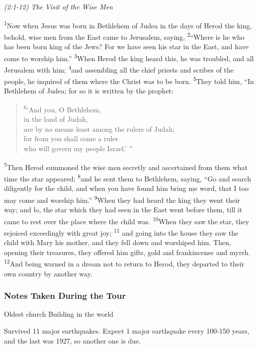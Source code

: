 \documentclass[letterpaper]{report}
\newcommand{\vs}[1]{\textsuperscript{#1}}
\begin{document}
{\centering
\emph{(2:1-12) The Visit of the Wise Men}\\
}
\begin{multicols}{2}
\vs{1}Now when Jesus was born in Bethlehem of Judea in the days of Herod the king,
behold, wise men from the East came to Jerusalem, saying,
\vs{2}``Where is he who has been born king of the Jews?
For we have seen his star in the East, and have come to worship him.''
\vs{3}When Herod the king heard this, he was troubled, and all Jerusalem with him;
\vs{4}and assembling all the chief priests and scribes of the people,
he inquired of them where the Christ was to be born.
\vs{5}They told him, ``In Bethlehem of Judea; for so it is written by the prophet:

\begin{verse}
\vs{6}`And you, O Bethlehem,\\
in the land of Judah,\\
are by no means least among the rulers of Judah;\\
for from you shall come a ruler\\
who will govern my people Israel.' ''\\ 
\end{verse}

\vs{7}Then Herod summoned the wise men secretly and ascertained from them what
time the star appeared;
\vs{8}and he sent them to Bethlehem, saying,
``Go and search diligently for the child,
and when you have found him bring me word,
that I too may come and worship him.''
\vs{9}When they had heard the king they went their way;
and lo, the star which they had seen in the East went before them,
till it came to rest over the place where the child was.
\vs{10}When they saw the star, they rejoiced exceedingly with great joy;
\vs{11} and going into the house they saw the child with Mary his mother,
and they fell down and worshiped him.
Then, opening their treasures, they offered him gifts,
gold and frankincense and myrrh.
\vs{12}And being warned in a dream not to return to Herod,
they departed to their own country by another way.
\end{multicols}

\subsubsection{Notes Taken During the Tour}

Oldest church Building in the world

Survived 11 major earthquakes. Expect 1 major earthquake every 100-150 years, and the last was 1927, so another one is due.
\end{document}
